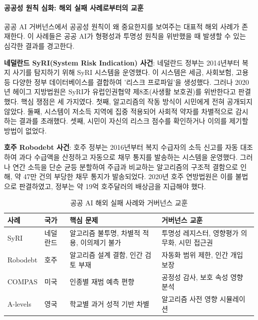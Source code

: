 \paragraph{공공성 원칙 심화: 해외 실패 사례로부터의 교훈}

공공 AI 거버넌스에서 공공성 원칙이 왜 중요한지를 보여주는 대표적 해외 사례가 존재한다. 이 사례들은 공공 AI가 형평성과 투명성 원칙을 위반했을 때 발생할 수 있는 심각한 결과를 경고한다.

\textbf{네덜란드 SyRI(System Risk Indication) 사건}: 네덜란드 정부는 2014년부터 복지 사기를 탐지하기 위해 SyRI 시스템을 운영했다. 이 시스템은 세금, 사회보험, 고용 등 다양한 정부 데이터베이스를 결합하여 '리스크 프로파일'을 생성했다. 그러나 2020년 헤이그 지방법원은 SyRI가 유럽인권협약 제8조(사생활 보호권)를 위반한다고 판결했다. 핵심 쟁점은 세 가지였다. 첫째, 알고리즘의 작동 방식이 시민에게 전혀 공개되지 않았다. 둘째, 시스템이 저소득 지역에 집중 적용되어 사회적 약자를 차별적으로 감시하는 결과를 초래했다. 셋째, 시민이 자신의 리스크 점수를 확인하거나 이의를 제기할 방법이 없었다.

\textbf{호주 Robodebt 사건}: 호주 정부는 2016년부터 복지 수급자의 소득 신고를 자동 대조하여 과다 수급액을 산정하고 자동으로 채무 통지를 발송하는 시스템을 운영했다. 그러나 연간 소득을 단순 균등 분할하여 주급과 비교하는 알고리즘의 구조적 결함으로 인해, 약 47만 건의 부당한 채무 통지가 발송되었다. 2020년 호주 연방법원은 이를 불법으로 판결하였고, 정부는 약 19억 호주달러의 배상금을 지급해야 했다.

\begin{table}[htbp]
\centering
\caption{공공 AI 해외 실패 사례와 거버넌스 교훈}
\label{tab:18_failures}
\begin{tabularx}{\textwidth}{p{2.5cm}p{2cm}Xp{4cm}}
\toprule
\textbf{사례} & \textbf{국가} & \textbf{핵심 문제} & \textbf{거버넌스 교훈} \\
\midrule
SyRI & 네덜란드 & 알고리즘 불투명, 차별적 적용, 이의제기 불가 & 투명성 레지스터, 영향평가\cite{raji2020closing} 의무화, 시민 접근권 \\
Robodebt & 호주 & 알고리즘 설계 결함, 인간 검토 부재 & 자동화 범위 제한, 인간 개입 보장 \\
COMPAS & 미국 & 인종별 재범 예측 편향 & 공정성 감사, 보호 속성 영향 분석 \\
A-levels & 영국 & 학교별 과거 성적 기반 차별 & 알고리즘 사전 영향 시뮬레이션 \\
\bottomrule
\end{tabularx}
\end{table}

